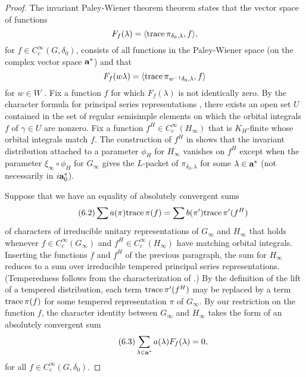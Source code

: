 \documentclass{amsart}
\newcommand\tr{\text{trace\,}}
\newcommand\bfa{\text{\bf a}}
\begin{document}
\begin{proof}
The invariant Paley-Wiener theorem theorem states that the
vector space of functions
	$$F_f(\lambda) = \langle \tr \pi_{\delta_0,\lambda},f\rangle,$$
for $f\in C_c^\infty(G,\delta_0)$, consists of all functions in the Paley-Wiener
space (on the complex vector space $\bfa^*$) 
and that
	$$F_f(w\lambda) = \langle\tr \pi_{w^{-1}\delta_0,\lambda},f\rangle$$
for $w\in W$ \cite{CD}.
Fix a function $f$ for which $F_f(\lambda)$ is not identically
zero.  By the character
formula for principal series representations \cite{Kn,10.18}, there
exists an open set $U$ contained in the set of regular semisimple
elements on which the orbital integrals $f$ of $\gamma\in U$ are nonzero.
Fix a function $f^H \in C_c^\infty(H_\infty)$ that is $K_H$-finite whose
orbital integrals match $f$.  The construction of $f^H$ in \cite{CD,A.4}
shows that the invariant distribution attached to a parameter $\phi_H$
for $H_\infty$ vanishes on $f^H$ except when the parameter
$\xi_\infty\circ\phi_H$ for $G_\infty$ gives the $L$-packet of
$\pi_{\delta_0,\lambda}$ for some $\lambda\in\bfa^*$ (not necessarily
in $i\bfa_0^*$).

Suppose that we have an equality of absolutely convergent sums
\begin{equation}\tag {6.2}
\sum a(\pi) \tr \pi(f) = \sum b(\pi') \tr \pi'(f^H)
\end{equation}
of characters of irreducible unitary representations of $G_\infty$
and $H_\infty$ that holds whenever $f\in C_c^\infty(G_\infty)$ 
and $f^H\in C_c^\infty(H_\infty)$ have matching
orbital integrals.  Inserting the functions $f$ and $f^H$ of the
previous paragraph, the sum for $H_\infty$ reduces to a sum
over irreducible tempered principal series
representations.  (Temperedness follows from the characterization of
 \cite{Kn,8.53,16.6}.)  By the definition of the lift
of a tempered distribution, each term $\tr\pi'(f^H)$ may
be replaced by a term $\tr\pi(f)$ for some tempered representation $\pi$
of $G_\infty$.  By our restriction on the function $f$, the 
character identity between $G_\infty$ and $H_\infty$ 
takes the form of an
absolutely convergent sum 
	\begin{equation}\tag {6.3}
        \sum_{\lambda\in\bfa^*} a(\lambda) F_f(\lambda) = 0,
        \end{equation}
for all $f\in C_c^\infty(G,\delta_0)$.


\end{proof}
\end{document}
